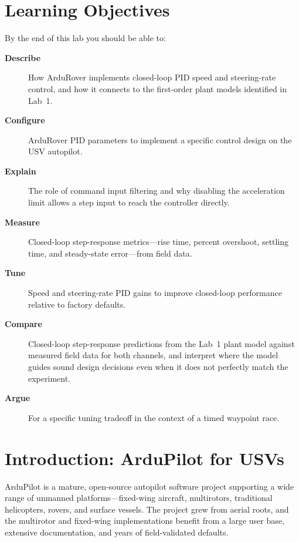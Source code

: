 \documentclass[../../book.tex]{subfiles}
\begin{document}
\graphicspath{{images/}}

\section{Learning Objectives}

By the end of this lab you should be able to:

\begin{description}
  \item[\textbf{Describe}] How ArduRover implements closed-loop PID speed and steering-rate control, and how it connects to the first-order plant models identified in Lab~1.
  \item[\textbf{Configure}] ArduRover PID parameters to implement a specific control design on the USV autopilot.
  \item[\textbf{Explain}] The role of command input filtering and why disabling the acceleration limit allows a step input to reach the controller directly.
  \item[\textbf{Measure}] Closed-loop step-response metrics---rise time, percent overshoot, settling time, and steady-state error---from field data.
  \item[\textbf{Tune}] Speed and steering-rate PID gains to improve closed-loop performance relative to factory defaults.
  \item[\textbf{Compare}] Closed-loop step-response predictions from the Lab~1 plant model against measured field data for both channels, and interpret where the model guides sound design decisions even when it does not perfectly match the experiment.
  \item[\textbf{Argue}] For a specific tuning tradeoff in the context of a timed waypoint race.
\end{description}

\section{Introduction: ArduPilot for USVs}

ArduPilot is a mature, open-source autopilot software project supporting a wide range of unmanned platforms---fixed-wing aircraft, multirotors, traditional helicopters, rovers, and surface vessels.  The project grew from aerial roots, and the multirotor and fixed-wing implementations benefit from a large user base, extensive documentation, and years of field-validated defaults.
\end{document}
